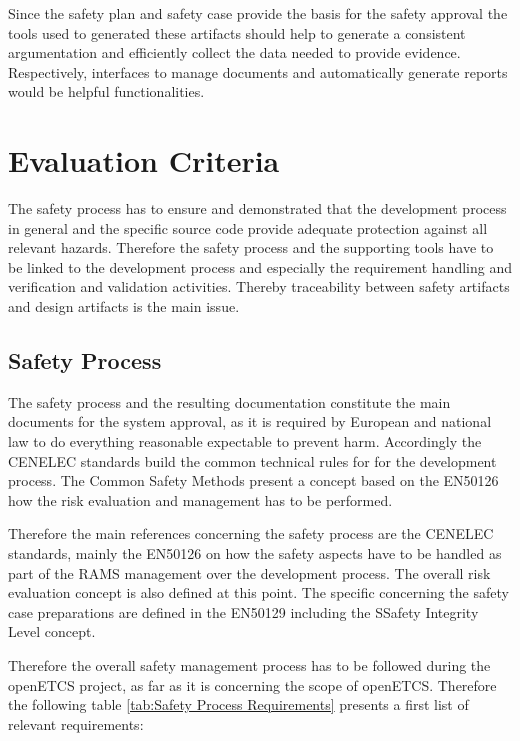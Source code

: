 \documentclass{template/openetcs_article}
\begin{document}
Since the safety plan and safety case provide the basis for the safety approval the tools used to generated these artifacts should help to generate a consistent argumentation and efficiently collect the data needed to provide evidence. Respectively, interfaces to manage documents and automatically generate reports would be helpful functionalities.

\section{Evaluation Criteria}

The safety process has to ensure and demonstrated that the development process in general and the specific source code provide adequate protection against all relevant hazards. Therefore the safety process and the supporting tools have to be linked to the development process and especially the requirement handling and verification and validation activities. Thereby traceability between safety artifacts and design artifacts is the main issue.

\subsection{Safety Process}

The safety process and the resulting documentation constitute the main documents for the system approval, as it is required by European and national law to do everything reasonable expectable to prevent harm. Accordingly the CENELEC standards build the common technical rules for for the development process. The Common Safety Methods present a concept based on the EN50126 how the risk evaluation and management has to be performed. 

Therefore the main references concerning the safety process are the CENELEC standards, mainly the EN50126 on how the safety aspects have to be handled as part of the RAMS management over the development process. The overall risk evaluation concept is also defined at this point. The specific concerning the safety case preparations are defined in the EN50129 including the SSafety Integrity Level concept. 

Therefore the overall safety management process has to be followed during the openETCS project, as far as it is concerning the scope of openETCS. Therefore the following table \ref{tab:Safety Process Requirements} presents a first list of relevant requirements:
\end{document}
